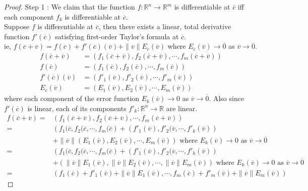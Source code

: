 \begin{proof}
	\par{Step 1 :} We claim that the function $f : \mathbb{R}^n \to \mathbb{R}^m$ is differentiable at $\overline{c}$ iff each component $f_k$ is differentiable at $\overline{c}$.\\

	Suppose $f$ is differentiable at $\overline{c}$, then there exists a linear, total derivative function $f'(\overline{c})$ satisfying first-order Taylor's formula at $\overline{c}$.\\
	ie, $f(\overline{c}+\overline{v}) = f(\overline{c}) + f'(\overline{c})(\overline{v}) + \|\overline{v}\| E_{\overline{c}}(\overline{v})$ where $E_{\overline{c}}(\overline{v}) \to \overline{0}$ as $\overline{v} \to \overline{0}$.
	\begin{align*}
		f(\overline{c}+\overline{v}) & = \left( f_1(\overline{c}+\overline{v}), f_2(\overline{c}+\overline{v}), \cdots, f_m(\overline{c}+\overline{v}) \right)\\
		f(\overline{c}) & = \left( f_1(\overline{c}), f_2(\overline{c}), \cdots, f_m(\overline{c}) \right) \\
		f'(\overline{c})(\overline{v}) & = \left( f'_1(\overline{v}), f'_2(\overline{v}), \cdots, f'_m(\overline{v}) \right) \\
		E_{\overline{c}}(\overline{v}) & = \left( E_1(\overline{v}), E_2(\overline{v}), \cdots, E_m(\overline{v}) \right)
	\end{align*}
	where each component of the error function $E_k(\overline{v}) \to 0$ as $\overline{v} \to \overline{0}$. Also since $f'(\overline{c})$ is linear, each of its components $f'_k : \mathbb{R}^n \to \mathbb{R}$ are linear.
	\begin{align*}
		f(\overline{c}+\overline{v}) = & \left( f_1(\overline{c}+\overline{v}), f_2(\overline{c}+\overline{v}), \cdots, f_m(\overline{c}+\overline{v}) \right) \\
		= & \left( f_1(\overline{c}, f_2(\overline{c}, \cdots, f_m(\overline{c} \right) + \left( f'_1(\overline{v}), f'_2(\overline{v}, \cdots, f'_k(\overline{v}) \right) \\
		& + \|\overline{v}\|\left(E_1(\overline{v}), E_2(\overline{v}), \cdots, E_m(\overline{v}) \right) \text{ where } E_k(\overline{v}) \to 0 \text{ as } \overline{v} \to \overline{0}\\
		= & \left( f_1(\overline{c}, f_2(\overline{c}, \cdots, f_m(\overline{c} \right) + \left( f'_1(\overline{v}), f'_2(\overline{v}, \cdots, f'_k(\overline{v}) \right) \\
		& + \left(\|\overline{v}\|E_1(\overline{v}), \|\overline{v}\|E_2(\overline{v}), \cdots, \|\overline{v}\|E_m(\overline{v}) \right) \text{ where } E_k(\overline{v}) \to 0 \text{ as } \overline{v} \to \overline{0}\\
		= & \left( f_1(\overline{c}) + f'_1(\overline{v}) + \|\overline{v}\|E_1(\overline{v}), \cdots, f_m(\overline{c}) + f'_m(\overline{v}) + \|\overline{v}\|E_m(\overline{v}) \right) 
	\end{align*}


\end{proof}
